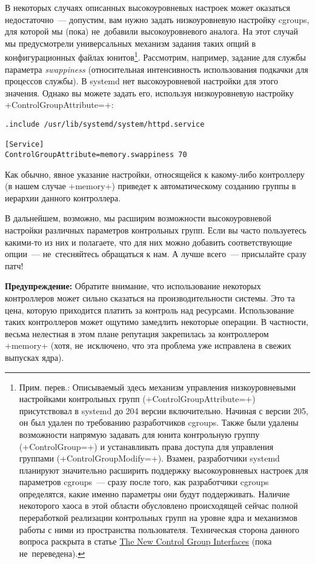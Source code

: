 \documentclass[10pt,oneside,a4paper]{article}
\newenvironment{caveat}[1][]{\smallskip\par\textbf{Предупреждение#1: }}%
	{\smallskip\par}
\begin{document}
В некоторых случаях описанных высокоуровневых настроек может оказаться
недостаточно~--- допустим, вам нужно задать низкоуровневую настройку cgroups,
для которой мы (пока) не~добавили высокоуровневого аналога. На этот случай мы
предусмотрели универсальных механизм задания таких опций в конфигурационных 
файлах юнитов\footnote{Прим. перев.: Описываемый здесь механизм управления
низкоуровневыми настройками контрольных групп (+ControlGroupAttribute=+)
присутствовал в systemd до 204 версии включительно. Начиная с версии 205, он был
удален по требованию разработчиков cgroups. Также были удалены возможности
напрямую задавать для юнита контрольную группу (+ControlGroup=+) и устанавливать
права доступа для управления группами (+ControlGroupModify=+). Взамен,
разработчики systemd планируют значительно расширить поддержку высокоуровневых
настроек для параметров cgroups~--- сразу после того, как разработчики
cgroups определятся, какие именно параметры они будут поддерживать. Наличие
некоторого хаоса в этой области обусловлено происходящей сейчас полной
переработкой реализации контрольных групп на уровне ядра и механизмов работы с
ними из пространства пользователя.  Техническая сторона данного вопроса раскрыта
в статье
\href{http://www.freedesktop.org/wiki/Software/systemd/ControlGroupInterface}%
{The New Control Group Interfaces} (пока не~переведена).}.  Рассмотрим,
например, задание для службы параметра \emph{swappiness} (относительная
интенсивность использования подкачки для процессов службы). В systemd нет
высокоуровневой настройки для этого значения.  Однако вы можете задать его,
используя низкоуровневую настройку +ControlGroupAttribute=+:
\begin{Verbatim}
.include /usr/lib/systemd/system/httpd.service

[Service]
ControlGroupAttribute=memory.swappiness 70
\end{Verbatim}
Как обычно, явное указание настройки, относящейся к какому-либо контроллеру (в
нашем случае +memory+) приведет к автоматическому созданию группы в иерархии
данного контроллера.

В дальнейшем, возможно, мы расширим возможности высокоуровневой настройки 
различных параметров контрольных групп. Если вы часто пользуетесь какими-то из
них и полагаете, что для них можно добавить соответствующие опции~---
не~стесняйтесь обращаться к нам. А лучше всего~--- присылайте сразу патч!

\begin{caveat}
	Обратите внимание, что использование некоторых контроллеров может сильно
	сказаться на производительности системы. Это та цена, которую приходится
	платить за контроль над ресурсами. Использование таких контроллеров
	может ощутимо замедлить некоторые операции. В частности, весьма
	нелестная в этом плане репутация закрепилась за контроллером +memory+
	(хотя, не~исключено, что эта проблема уже исправлена в свежих выпусках
	ядра).
\end{caveat}
\end{document}
